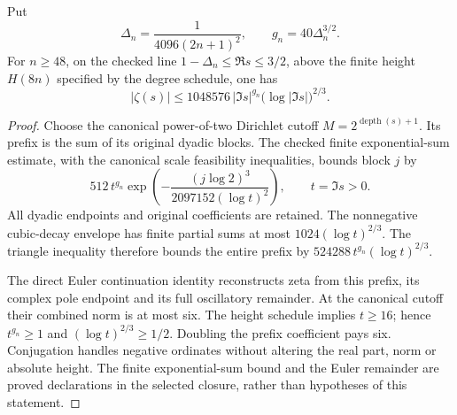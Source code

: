\begin{lemma}
\label{analytic:near-one-growth}
\leanok
Put
\[
 \Delta_n=\frac1{4096(2n+1)^2},\qquad
 g_n=40\Delta_n^{3/2}.
\]
For $n\ge48$, on the checked line
$1-\Delta_n\le\Re s\le3/2$, above the finite height
$H(8n)$ specified by the degree schedule, one has
\[
 |\zeta(s)|\le
 1048576\,|\Im s|^{g_n}
                 \bigl(\log|\Im s|\bigr)^{2/3}.
\]
\end{lemma}
\begin{proof}
Choose the canonical power-of-two Dirichlet cutoff
$M=2^{\operatorname{depth}(s)+1}$.
Its prefix is the sum of its original dyadic blocks.
The checked finite exponential-sum estimate, with the canonical
scale feasibility inequalities, bounds block $j$ by
\[
 512\,t^{g_n}
 \exp\left(-\frac{(j\log2)^3}{2097152(\log t)^2}\right),
 \qquad t=\Im s>0.
\]
All dyadic endpoints and original coefficients are retained.
The nonnegative cubic-decay envelope has finite partial sums at most
$1024(\log t)^{2/3}$.  The triangle inequality therefore bounds the
entire prefix by
$524288\,t^{g_n}(\log t)^{2/3}$.

The direct Euler continuation identity reconstructs zeta from this
prefix, its complex pole endpoint and its full oscillatory remainder.
At the canonical cutoff their combined norm is at most six.
The height schedule implies $t\ge16$; hence $t^{g_n}\ge1$ and
$(\log t)^{2/3}\ge1/2$.  Doubling the prefix coefficient pays six.
Conjugation handles negative ordinates without altering the real
part, norm or absolute height.
The finite exponential-sum bound and the Euler remainder are proved
declarations in the selected closure, rather than hypotheses of
this statement.
\end{proof}

